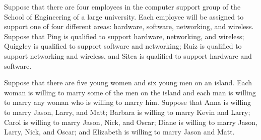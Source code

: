 \documentclass{exam}
\begin{document}
\begin{questions}

\question
Suppose that there are four employees in the computer
support group of the School of Engineering of a large university. Each employee will be assigned to support one
of four different areas: hardware, software, networking,
and wireless. Suppose that Ping is qualified to support
hardware, networking, and wireless; Quiggley is qualified to support software and networking; Ruiz is qualified
to support networking and wireless, and Sitea is qualified
to support hardware and software.
\question 
Suppose that there are five young women and six young
men on an island. Each woman is willing to marry some
of the men on the island and each man is willing to marry
any woman who is willing to marry him. Suppose that
Anna is willing to marry Jason, Larry, and Matt; Barbara
is willing to marry Kevin and Larry; Carol is willing to
marry Jason, Nick, and Oscar; Diane is willing to marry
Jason, Larry, Nick, and Oscar; and Elizabeth is willing to
marry Jason and Matt.
\end{questions}
\end{document}
